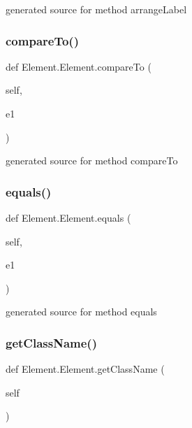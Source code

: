 \begin{DoxyVerb}generated source for method arrangeLabel \end{DoxyVerb}
 \hypertarget{class_element_1_1_element_acc377fb2d5856281eb9804b2a3275edc}{}\label{class_element_1_1_element_acc377fb2d5856281eb9804b2a3275edc} 
\subsubsection{\texorpdfstring{compare\+To()}{compareTo()}}
{\footnotesize\ttfamily def Element.\+Element.\+compare\+To (\begin{DoxyParamCaption}\item[{}]{self,  }\item[{}]{e1 }\end{DoxyParamCaption})}

\begin{DoxyVerb}generated source for method compareTo \end{DoxyVerb}
 \hypertarget{class_element_1_1_element_adf032a6f79735b75e3f1071cc708f626}{}\label{class_element_1_1_element_adf032a6f79735b75e3f1071cc708f626} 
\subsubsection{\texorpdfstring{equals()}{equals()}}
{\footnotesize\ttfamily def Element.\+Element.\+equals (\begin{DoxyParamCaption}\item[{}]{self,  }\item[{}]{e1 }\end{DoxyParamCaption})}

\begin{DoxyVerb}generated source for method equals \end{DoxyVerb}
 \hypertarget{class_element_1_1_element_a5e7edd71cdc182f6449cdb47fb6d396b}{}\label{class_element_1_1_element_a5e7edd71cdc182f6449cdb47fb6d396b} 
\subsubsection{\texorpdfstring{get\+Class\+Name()}{getClassName()}}
{\footnotesize\ttfamily def Element.\+Element.\+get\+Class\+Name (\begin{DoxyParamCaption}\item[{}]{self }\end{DoxyParamCaption})}

